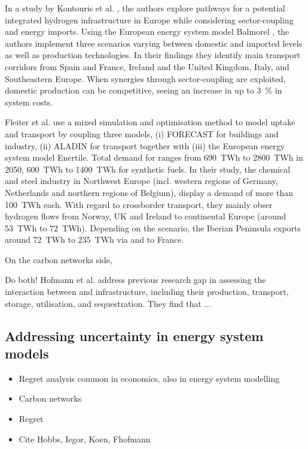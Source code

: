 \documentclass[preprint,12pt,sort&compress]{elsarticle}
\begin{document}
In a study by Kontouris et al. \cite{kountourisUnifiedEuropeanHydrogen2024}, the authors explore pathways for a potential integrated hydrogen infrastructure in Europe while considering sector-coupling and energy imports. Using the European energy system model Balmorel \cite{wieseBalmorelOpenSource2018}, the authors implement three scenarios varying between domestic and imported  levels as well as  production technologies. In their findings they identify main  transport corridors from Spain and France, Ireland and the United Kingdom, Italy, and Southeastern Europe. When synergies through sector-coupling are exploited, domestic  production can be competitive, seeing an increase in up to \SI{3}{\percent} in system costs.

Fleiter et al. \cite{fleiterHydrogenInfrastructureFuture2025} use a mixed simulation and optimisation method to model  uptake and transport by coupling three models, (i) FORECAST for buildings and industry, (ii) ALADIN for transport together with (iii) the European energy system model Enertile. Total demand for  ranges from \SI{690}{TWh} to \SI{2800}{TWh} in 2050, \SI{600}{TWh} to \SI{1400}{TWh} for synthetic fuels. In their study, the  chemical and steel industry in Northwest Europe (incl. western regions of Germany, Netherlands and northern regions of Belgium), display a demand of more than \SI{100}{TWh} each. With regard to crossborder transport, they mainly obser hydrogen flows from Norway, UK and Ireland to continental Europe (around \SI{53}{TWh} to \SI{72}{TWh}). Depending on the scenario, the Iberian Peninsula exports around \SI{72}{TWh} to \SI{235}{TWh} via and to France.

On the carbon networks side, \cite{bakkenLinearModelsOptimization2008}

Do both!
Hofmann et al. \cite{hofmannH2CO2Network2025} address previous research gap in assessing the interaction between  and  infrastructure, including their production, transport, storage, utilisation, and sequestration. They find that ...
\subsection{Addressing uncertainty in energy system models}

\begin{itemize}
  \item Regret analysis common in economics, also in energy system modelling
  \item Carbon networks
  \item Regret
  \item Cite Hobbs, Iegor, Koen, Fhofmann
\end{itemize}
\end{document}
